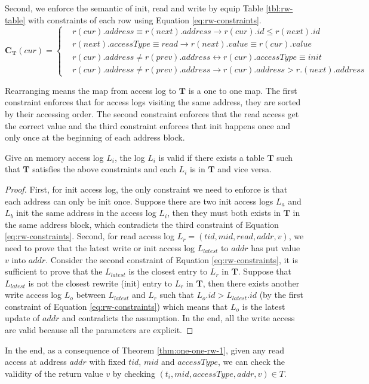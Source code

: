 \noindent Second, we enforce the semantic of init, read and write by equip Table \ref{tbl:rw-table} with constraints of each row using Equation \ref{eq:rw-constraints}.
\begin{equation}
\label{eq:rw-constraints}
\mathbf{C}_{\mathbf{T}}(cur) = \begin{cases}
    &r(cur).address \equiv r(next).address \rightarrow r(cur).id \le r(next).id \\
    &r(next).accessType \equiv read \rightarrow r(next).value \equiv r(cur).value \\
    &r(cur).address \neq r(prev).address \leftrightarrow r(cur).accessType \equiv init \\
    &r(cur).address \neq r(prev).address \rightarrow r(cur).address > r.(next).address
\end{cases}
\end{equation}
\begin{remark}
Rearranging means the map from access log to $\mathbf{T}$ is a one to one map.
The first constraint enforces that for access logs visiting the same address, they are sorted by their accessing order.  The second constraint enforces that the read access get the correct value and the third constraint enforces that init happens once and only once at the beginning of each address block. 
\end{remark}
\begin{theorem}
\label{thm:one-one-rw-1}
Give an memory access log ${L_i}$, the log ${L_i}$ is valid if there exists a table $\mathbf{T}$ such that $\mathbf{T}$ satisfies the above constraints and each $L_i$ is in $\mathbf{T}$ and vice versa. 
\end{theorem}
\begin{proof}
First, for init access log, the only constraint we need to enforce is that each address can only be init once. Suppose there are two init access logs $L_a$ and $L_b$ init the same address in the access log ${L_i}$, then they must both exists in $\mathbf{T}$ in the same address block, which contradicts the third constraint of Equation \ref{eq:rw-constraints}. Second, for read access log $L_r = (tid, mid, read, addr, v)$, we need to prove that the latest write or init access log $L_{latest}$ to $addr$ has put value $v$ into $addr$. Consider the second constraint of Equation \ref{eq:rw-constraints}, it is sufficient to prove that the $L_{latest}$ is the closest entry to $L_r$ in $\mathbf{T}$. Suppose that $L_{latest}$ is not the closest rewrite (init) entry to $L_r$ in $\mathbf{T}$, then there exists another write access log $L_o$ between $L_{latest}$ and $L_r$ such that $L_o.id > L_{latest}.id$ (by the first constraint of Equation \ref{eq:rw-constraints}) which means that $L_o$ is the latest update of $addr$ and contradicts the assumption. In the end, all the write access are valid because all the parameters are explicit.
\end{proof}
In the end, as a consequence of Theorem \ref{thm:one-one-rw-1}, given any read access at address $addr$ with fixed $tid$, $mid$ and $accessType$, we can check the validity of the return value $v$ by checking $(t_i, mid, accessType, addr, v) \in T$.

